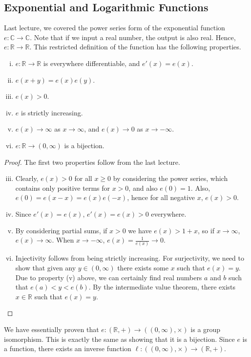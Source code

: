 \documentclass{article}
\begin{document}
\subsection{Exponential and Logarithmic Functions}
Last lecture, we covered the power series form of the exponential function $e \colon \mathbb C \to \mathbb C$. Note that if we input a real number, the output is also real. Hence, $e \colon \mathbb R \to \mathbb R$. This restricted definition of the function has the following properties.
\begin{theorem}
	\begin{enumerate}[(i)]
		\item $e \colon \mathbb R \to \mathbb R$ is everywhere differentiable, and $e'(x) = e(x)$.
		\item $e(x+y) = e(x)e(y)$.
		\item $e(x) > 0$.
		\item $e$ is strictly increasing.
		\item $e(x) \to \infty$ as $x \to \infty$, and $e(x) \to 0$ as $x \to -\infty$.
		\item $e \colon \mathbb R \to (0, \infty)$ is a bijection.
	\end{enumerate}
\end{theorem}
\begin{proof}
	The first two properties follow from the last lecture.
	\begin{enumerate}[(i)]
		\setcounter{enumi}{2}
		\item Clearly, $e(x) > 0$ for all $x \geq 0$ by considering the power series, which contains only positive terms for $x>0$, and also $e(0) = 1$. Also, $e(0) = e(x - x) = e(x)e(-x)$, hence for all negative $x$, $e(x) > 0$.
		\item Since $e'(x) = e(x)$, $e'(x) = e(x) > 0$ everywhere.
		\item By considering partial sums, if $x>0$ we have $e(x) > 1+x$, so if $x \to \infty$, $e(x) \to \infty$. When $x \to -\infty$, $e(x) = \frac{1}{e(x)} \to 0$.
		\item Injectivity follows from being strictly increasing. For surjectivity, we need to show that given any $y \in (0, \infty)$ there exists some $x$ such that $e(x) = y$. Due to property (v) above, we can certainly find real numbers $a$ and $b$ such that $e(a) < y < e(b)$. By the intermediate value theorem, there exists $x \in \mathbb R$ such that $e(x) = y$.
	\end{enumerate}
\end{proof}
\begin{remark}
	We have essentially proven that $e \colon (\mathbb R, +) \to ((0, \infty), \times)$ is a group isomorphism. This is exactly the same as showing that it is a bijection. Since $e$ is a function, there exists an inverse function $\ell \colon ((0, \infty), \times) \to (\mathbb R, +)$.
\end{remark}
\end{document}
